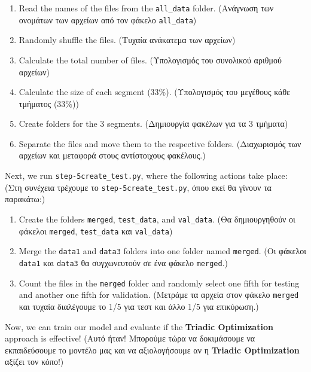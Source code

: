 \documentclass[a4paper,11pt]{article}
\begin{document}
\begin{enumerate}
    \item Read the names of the files from the \texttt{all\_data} folder. (Ανάγνωση των ονομάτων των αρχείων από τον φάκελο \texttt{all\_data})
    \item Randomly shuffle the files. (Τυχαία ανάκατεμα των αρχείων)
    \item Calculate the total number of files. (Υπολογισμός του συνολικού αριθμού αρχείων)
    \item Calculate the size of each segment (33\%). (Υπολογισμός του μεγέθους κάθε τμήματος (33\%))
    \item Create folders for the 3 segments. (Δημιουργία φακέλων για τα 3 τμήματα)
    \item Separate the files and move them to the respective folders. (Διαχωρισμός των αρχείων και μεταφορά στους αντίστοιχους φακέλους.)
\end{enumerate}

Next, we run \texttt{step-5create\_test.py}, where the following actions take place: (Στη συνέχεια τρέχουμε το \texttt{step-5create\_test.py}, όπου εκεί θα γίνουν τα παρακάτω:)

\begin{enumerate}
    \item Create the folders \texttt{merged}, \texttt{test\_data}, and \texttt{val\_data}. (Θα δημιουργηθούν οι φάκελοι \texttt{merged}, \texttt{test\_data} και \texttt{val\_data})
    \item Merge the \texttt{data1} and \texttt{data3} folders into one folder named \texttt{merged}. (Οι φάκελοι \texttt{data1} και \texttt{data3} θα συγχωνευτούν σε ένα φάκελο \texttt{merged}.)
    \item Count the files in the \texttt{merged} folder and randomly select one fifth for testing and another one fifth for validation. (Μετράμε τα αρχεία στον φάκελο \texttt{merged} και τυχαία διαλέγουμε το 1/5 για τεστ και άλλο 1/5 για επικύρωση.)
\end{enumerate}

Now, we can train our model and evaluate if the \textbf{Triadic Optimization} approach is effective! (Αυτό ήταν! Μπορούμε τώρα να δοκιμάσουμε να εκπαιδεύσουμε το μοντέλο μας και να αξιολογήσουμε αν η \textbf{Triadic Optimization} αξίζει τον κόπο!)
\end{document}
